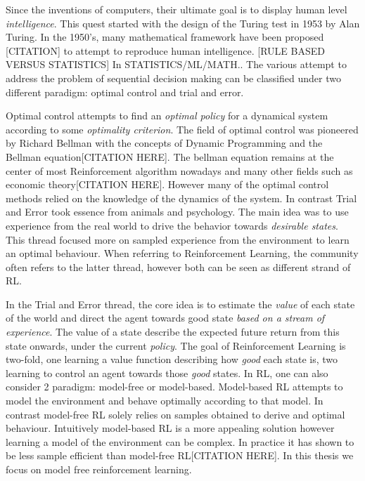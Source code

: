 Since the inventions of computers, their ultimate goal is to display human level \emph{intelligence}. This quest started with the design of the Turing test in 1953 by Alan Turing. In the 1950's, many mathematical framework have been proposed \citep{hayes1985rule}[CITATION] to attempt to reproduce human intelligence. [RULE BASED VERSUS STATISTICS] In STATISTICS/ML/MATH.. The various attempt to address the problem of sequential decision making can be classified under two different paradigm: optimal control and trial and error.

 Optimal control attempts to find an \emph{optimal policy} for a dynamical system according to some \emph{optimality criterion}.  The field of optimal control was pioneered by Richard Bellman with the concepts of Dynamic Programming and the Bellman equation[CITATION HERE]. The bellman equation remains at the center of most Reinforcement algorithm nowadays and many other fields such as economic theory[CITATION HERE]. However many of the optimal control methods relied on the knowledge of the dynamics of the system. In contrast Trial and Error took essence from animals and psychology. The main idea was to use experience from the real world to drive the behavior towards \emph{desirable states}. This thread focused more on sampled experience from the environment to learn an optimal behaviour. When referring to Reinforcement Learning, the community often refers to the latter thread, however both can be seen as different strand of RL.

 In the Trial and Error thread, the core idea is to estimate the \emph{value} of each state of the world and direct the agent towards good state \emph{based on a stream of experience}. The value of a state describe the expected future return from this state onwards, under the current \emph{policy}. The goal of Reinforcement Learning is two-fold, one learning a value function describing how \emph{good} each state is, two learning to control an agent towards those \emph{good} states. In RL, one can also consider 2 paradigm: model-free or model-based. Model-based RL attempts to model the environment and behave optimally according to that model. In contrast model-free RL solely relies on samples obtained to derive and optimal behaviour. Intuitively model-based RL is a more appealing solution however learning a model of the environment can be complex. In practice it has shown to be less sample efficient than model-free RL[CITATION HERE]. In this thesis we focus on model free reinforcement learning.
   

